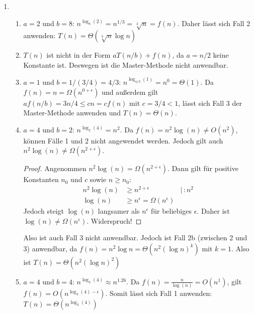 \documentclass[11pt,a4paper]{article}
\begin{document}
\begin{loesung}
\begin{enumerate}
    \item
    \begin{enumerate}[label=\roman*)]
        \item $a = 2$ und $b = 8$: $n^{\log_8(2)} = n^{1/3}=\sqrt[3]{n} = f(n)$.
        Daher lässt sich Fall 2 anwenden: 
        $T(n) = \Theta(\sqrt[3]{n} \log n)$

        \item $T(n)$ ist nicht in der Form $a T(n / b) + f(n)$, da $a = n / 2$ keine Konstante ist. Deswegen ist die Master-Methode nicht anwendbar.

        \item $a = 1$ und $b = 1 / (3 / 4) = 4 / 3$:
        $n^{\log_{4/3}(1)} = n^0 = \Theta(1)$. Da $f(n) = n = \Omega(n^{0 + \epsilon})$
        und außerdem gilt $a f(n / b) = 3n/4 \leq c n = c f(n)$ mit $c = 3/4 < 1$, 
        lässt sich Fall 3 der Master-Methode anwenden und $T(n) = \Theta(n)$.

        \item $a=4$ und $b=2$: $n^{\log_2(4)} = n^2$.
        Da $f(n) = n^2 \log(n) \neq O(n^2)$, können Fälle 1 und 2 nicht angewendet werden.
        Jedoch gilt auch $n^2 \log(n) \neq \Omega(n^{2 + \epsilon})$.
        \begin{proof}
            Angenommen $n^2 \log(n) = \Omega(n^{2 + \epsilon})$. Dann gilt für positive Konstanten $n_0$ und $c$ sowie $n \geq n_0$:
            \begin{align*}
                n^2 \log(n) &\geq n^{2 + \epsilon} &\mid \, : n^2 \\
                \log(n) &\geq n^\epsilon = \Omega(n^\epsilon)
            \end{align*}
            Jedoch steigt $\log(n)$ langsamer als $n^\epsilon$ für beliebiges $\epsilon$.
            Daher ist $\log(n) \neq \Omega(n^\epsilon)$. Widerspruch!
        \end{proof}
        Also ist auch Fall 3 nicht anwendbar.
        Jedoch ist Fall 2b (zwischen 2 und 3) anwendbar, da $f(n) = n^2 \log n = \Theta(n^2 (\log n)^k)$ mit $k = 1$. Also ist $T(n) = \Theta(n^2 (\log n)^2)$

        \item $a = 4$ und $b = 4$: $n^{\log_3(4)} \approx n^{1.26}$. Da $f(n) = \frac{n}{\log(n)} = O(n^1)$, gilt $f(n) = O(n^{\log_3(4) - \epsilon})$. 
        Somit lässt sich Fall 1 anwenden: $T(n) = \Theta(n^{\log_3(4)})$


\end{enumerate}
\end{enumerate}
\end{loesung}
\end{document}
